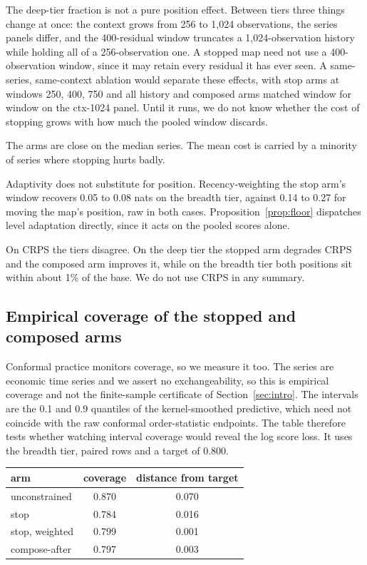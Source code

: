 \documentclass[11pt]{article}
\theoremstyle{remark}
\begin{document}
The deep-tier fraction is not a pure position effect. Between tiers three things
change at once: the context grows from 256 to 1{,}024 observations, the series
panels differ, and the 400-residual window truncates a 1{,}024-observation history
while holding all of a 256-observation one. A stopped map need not use a
400-observation window, since it may retain every residual it has ever seen. A
same-series, same-context ablation would separate these effects, with stop arms at
windows 250, 400, 750 and all history and composed arms matched window for window
on the ctx-1024 panel. Until it runs, we do not know whether the cost of stopping
grows with how much the pooled window discards.

The arms are close on the median series. The mean cost is carried by a
minority of series where stopping hurts badly.

Adaptivity does not substitute for position. Recency-weighting the stop arm's
window recovers 0.05 to 0.08 nats on the breadth tier, against 0.14 to 0.27
for moving the map's position, raw in both cases. Proposition~\ref{prop:floor} dispatches level adaptation
directly, since it acts on the pooled scores alone.

On CRPS the tiers disagree. On the deep tier the stopped arm degrades CRPS and
the composed arm improves it, while on the breadth tier both positions sit within
about 1\% of the base. We do not use CRPS in any summary.

\subsection{Empirical coverage of the stopped and composed arms}\label{sec:blind}

Conformal practice monitors coverage, so we measure it too. The series are
economic time series and we assert no exchangeability, so this is empirical
coverage and not the finite-sample certificate of Section~\ref{sec:intro}. The
intervals are the 0.1 and 0.9 quantiles of the kernel-smoothed predictive, which
need not coincide with the raw conformal order-statistic endpoints. The table
therefore tests whether watching interval coverage would reveal the log score loss.
It uses the breadth tier, paired rows and a target of 0.800.

\begin{center}
\begin{tabular}{lcc}
\toprule
arm & coverage & distance from target \\
\midrule
unconstrained    & 0.870 & 0.070 \\
stop             & 0.784 & 0.016 \\
stop, weighted   & 0.799 & 0.001 \\
compose-after    & 0.797 & 0.003 \\
\bottomrule
\end{tabular}
\end{center}
\end{document}
